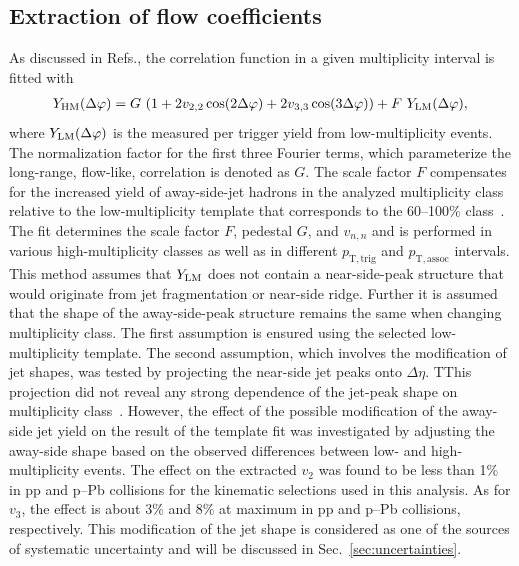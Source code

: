 \subsection{Extraction of flow coefficients}

As discussed in Refs.\cite{ATLAS:2015hzw,ATLAS:2016yzd}, the correlation function in a given multiplicity interval is fitted with 
\begin{eqnarray}
\label{eq:narray}
Y_{\rm{HM}}(\Delta\varphi) = G~(1 + 2v_{2,2}\cos(2\Delta\varphi) + 2v_{3,3}\cos(3\Delta\varphi)) + F~Y_{\rm{LM}}(\Delta\varphi),
\label{eq:tmpfit}
\end{eqnarray}
where $Y_{\rm{LM}}(\Delta\varphi)$ is the measured per trigger yield from low-multiplicity events. The normalization factor for the first three Fourier terms, which parameterize the long-range, flow-like, correlation is denoted as $G$. The scale factor $F$ compensates for the increased yield of away-side-jet hadrons in the analyzed multiplicity class relative to the low-multiplicity template that corresponds to the 60--100\% class~\cite{ALICE:2013tla,ALICE:2014mas}.
The fit determines the scale factor $F$, pedestal $G$, and $v_{n,n}$ and is performed in various high-multiplicity classes as well as in different $p_\mathrm{T,trig}$ and $p_\mathrm{T,assoc}$ intervals. 
This method assumes that $Y_{\rm{LM}}$ does not contain a near-side-peak structure that would originate from jet fragmentation or near-side ridge.
Further it is assumed that the shape of the away-side-peak structure remains the same when changing multiplicity class.
The first assumption is ensured using the selected low-multiplicity template. The second assumption, which involves the modification of jet shapes, was tested by projecting the near-side jet peaks onto $\Delta\eta$. TThis projection did not reveal any strong dependence of the jet-peak shape on multiplicity class~\cite{LAKOMOV2017329}. However, the effect of the possible modification of the away-side jet yield on the result of the template fit was investigated by adjusting the away-side shape based on the observed differences between low- and high-multiplicity events. The effect on the extracted $v_2$ was found to be less than 1$\%$ in pp and p--Pb collisions for the kinematic selections used in this analysis. As for $v_3$, the effect is about 3\% and 8$\%$ at maximum in pp and p--Pb collisions, respectively.  This modification of the jet shape is considered as one of the sources of systematic uncertainty and will be discussed in Sec.~\ref{sec:uncertainties}.


